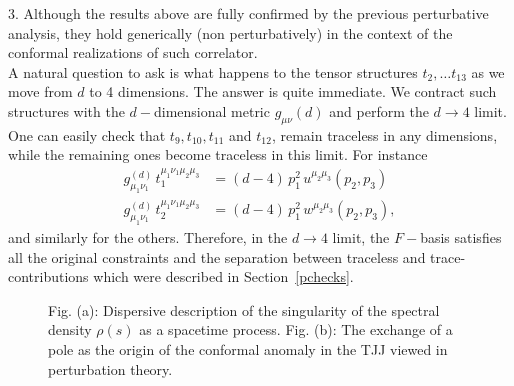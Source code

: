\documentclass[a4paper,11pt,openright,twoside]{book}
\newcommand{\secref}[1]{Section~\ref{#1}}		%
\numberwithin{equation}{section}
\begin{document}
{{3. Although the results above are fully confirmed by the previous perturbative analysis, 
they hold generically (non perturbatively) in the context of the conformal realizations of such correlator.\\ 
A natural question to ask is what happens to the tensor structures $t_2,\ldots t_{13}$ as we move from $d$ to 4 dimensions. The answer is quite immediate.  We contract such 
structures with the $d-$dimensional metric $g_{\mu\nu}(d)$ and perform the $d\to 4$ limit. One can easily check that $t_9,t_{10},t_{11}$ and $t_{12}$, remain traceless in any dimensions, 
while the remaining ones become traceless in this limit. For instance 
\begin{align}
	g_{\mu_1\nu_1}^{(d)}\,t_1^{\mu_1\nu_1\mu_2\mu_3}&=(d-4)\,p_1^2\,u^{\mu_2\mu_3}(p_2,p_3)\\
	g_{\mu_1\nu_1}^{(d)}\,t_2^{\mu_1\nu_1\mu_2\mu_3}&=(d-4)\,p_1^2\,w^{\mu_2\mu_3}(p_2,p_3),
\end{align}
and similarly for the others. Therefore, in the $d\to 4$ limit, the $F-$basis satisfies all the original constraints and the separation between traceless and trace-contributions which were described in \secref{pchecks}.
\begin{figure}[t]
	\centering
	\vspace{-1cm}
	\hspace{0.5cm}
	\caption{\small Fig. (a): Dispersive description of the singularity of the spectral density $\rho(s)$ as a spacetime process. Fig. (b): The exchange of a pole as the origin of the conformal anomaly in the TJJ viewed in perturbation theory.}
	\label{collinear}
\end{figure}
}}
\end{document}

